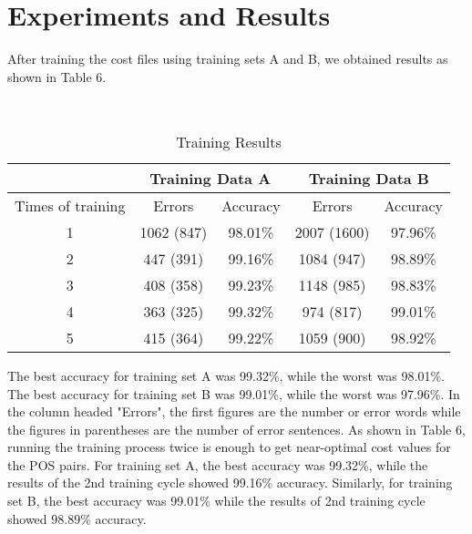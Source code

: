 \documentclass[english]{nlp}
\begin{document}
\section{Experiments and Results}
After training the cost files using training sets A and B, we obtained results as
shown in Table 6.
\begin{table}[ht]
\begin{center}
\caption{Training Results}
~\\\vspace{-2mm}
\label{table:training_results}
\begin{tabular}{|c|c|c|c|c|}
\cline{2-5}
\multicolumn{1}{c||}{~} & \multicolumn{2}{|c|}{Training Data A} & \multicolumn{2}{||c|}{Training Data B} \\
\hline
\multicolumn{1}{|c||}{Times of training} & 
\multicolumn{1}{|c|}{Errors} & 
\multicolumn{1}{|c|}{Accuracy} & 
\multicolumn{1}{||c|}{Errors} & 
\multicolumn{1}{|c|}{Accuracy} \\ 
\hline
\multicolumn{1}{|c||}{1} &
\multicolumn{1}{|c|}{1062 (847)} &
\multicolumn{1}{|c|}{98.01\%}  & 
\multicolumn{1}{||c|}{2007 (1600)} &
\multicolumn{1}{|c|}{97.96\%} \\
\hline
\multicolumn{1}{|c||}{2} &
\multicolumn{1}{|c|}{447 (391)} &
\multicolumn{1}{|c|}{99.16\%}  & 
\multicolumn{1}{||c|}{1084 (947)} &
\multicolumn{1}{|c|}{98.89\%} \\
\hline
\multicolumn{1}{|c||}{3} &
\multicolumn{1}{|c|}{408 (358)} &
\multicolumn{1}{|c|}{99.23\%}  & 
\multicolumn{1}{||c|}{1148 (985)} &
\multicolumn{1}{|c|}{98.83\%} \\
\hline
\multicolumn{1}{|c||}{4} &
\multicolumn{1}{|c|}{363 (325)} &
\multicolumn{1}{|c|}{99.32\%}  & 
\multicolumn{1}{||c|}{974 (817)} &
\multicolumn{1}{|c|}{99.01\%} \\
\hline
\multicolumn{1}{|c||}{5} &
\multicolumn{1}{|c|}{415 (364)} &
\multicolumn{1}{|c|}{99.22\%}  & 
\multicolumn{1}{||c|}{1059 (900)} &
\multicolumn{1}{|c|}{98.92\%} \\
\hline
\end{tabular}
\end{center}
\end{table}
The best accuracy for training set A was 99.32\%, while the worst 
was 98.01\%.
The best accuracy for training set B was 99.01\%, 
while the worst was 97.96\%.
In the column headed "Errors", the first figures are the number or error words while
the figures in parentheses are the number of error sentences.
As shown in Table 6, running the training process twice is
enough to get near-optimal cost values for the POS pairs.
For training set A, the best accuracy was 99.32\%, while the 
results of the 2nd training cycle showed 99.16\% accuracy.
Similarly, for training set B, the best accuracy was 99.01\% while the 
results of 2nd training cycle showed 98.89\% accuracy.
\end{document}
